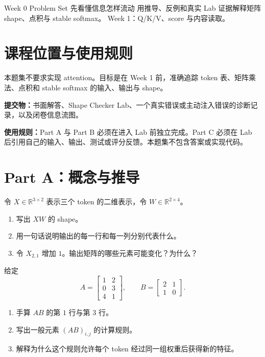 \documentclass[11pt,a4paper]{article}
\begin{document}
\CourseCover
  {Week 0 Problem Set}
  {先看懂信息怎样流动}
  {用推导、反例和真实 Lab 证据解释矩阵 shape、点积与 stable softmax。}
  {Week 1：Q/K/V、score 与内容读取。}

\section{课程位置与使用规则}

本题集不要求实现 attention。目标是在 Week 1 前，准确追踪 token 表、矩阵乘法、点积和 stable softmax 的输入、输出与 shape。

\textbf{提交物：}书面解答、Shape Checker Lab、一个真实错误或主动注入错误的诊断记录，以及闭卷信息流图。

\textbf{使用规则：}Part A 与 Part B 必须在进入 Lab 前独立完成。Part C 必须在 Lab 后引用自己的输入、输出、测试或评分反馈。本题集不包含答案或实现代码。

\section{Part A：概念与推导}

令 $X \in \mathbb{R}^{3 \times 2}$ 表示三个 token 的二维表示，令 $W \in \mathbb{R}^{2 \times 4}$。
\begin{enumerate}[label=(\arabic*)]
\item 写出 $XW$ 的 shape。
\item 用一句话说明输出的每一行和每一列分别代表什么。
\item 令 $X_{2,1}$ 增加 $1$。输出矩阵的哪些元素可能变化？为什么？
\end{enumerate}
\AnswerSpace{30mm}

给定
\[
A = \begin{bmatrix} 1 & 2 \\ 0 & 3 \\ 4 & 1 \end{bmatrix},
\qquad
B = \begin{bmatrix} 2 & 1 \\ 1 & 0 \end{bmatrix}.
\]
\begin{enumerate}[label=(\arabic*)]
\item 手算 $AB$ 的第 $1$ 行与第 $3$ 行。
\item 写出一般元素 $(AB)_{i,j}$ 的计算规则。
\item 解释为什么这个规则允许每个 token 经过同一组权重后获得新的特征。
\end{enumerate}
\AnswerSpace{30mm}
\end{document}

